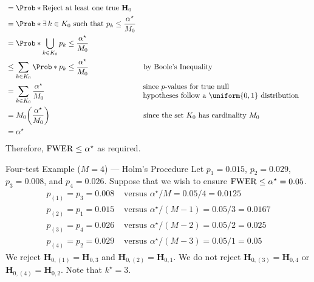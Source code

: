 \begin{Proof}{ \dagger}{}
\begin{align*}
             & =\Prob*{\text{Reject at least one true $\mathbf{H}_0$}}                                                                            \\
             & =\Prob*{\exists\, k\in K_0\text{ such that }p_k\le \frac{\alpha^\star}{M_0}}                                                       \\
             & =\Prob*{\bigcup_{k\in K_0}p_k\le \frac{\alpha^\star}{M_0}}                                                                         \\
             & \le \sum_{k\in K_0}\Prob*{p_k\le \frac{\alpha^\star}{M_0}}                   &  & \text{by Boole's Inequality}                     \\
             & =\sum_{k\in K_0}\frac{\alpha^\star}{M_0}                                     &  & \!\!\!\!\begin{tabular}{l}
                  \text{since $p$-values for true null} \\
                  \text{hypotheses follow a $\uniform{0,1}$ distribution}
            \end{tabular}               \\
             & =M_0\biggl(\frac{\alpha^\star}{M_0}\biggr)                                   &  & \text{since the set $K_0$ has cardinality $M_0$} \\
             & =\alpha^\star
      \end{align*}
      Therefore, $ \operatorname{FWER}\le \alpha^\star $ as required.
\end{Proof}
\begin{Example}{Four-test Example ($ M=4 $) --- Holm's Procedure}{}
      Let $ p_1=0.015 $, $ p_2=0.029 $, $ p_3=0.008 $, and $ p_4=0.026 $. Suppose that we wish to ensure
      $ \operatorname{FWER}\le \alpha^\star=0.05 $.
      \begin{align*}
            p_{(1)}=p_3=0.008 & \text{ versus } \alpha^\star/M=0.05/4=0.0125     \\
            p_{(2)}=p_1=0.015 & \text{ versus } \alpha^\star/(M-1)=0.05/3=0.0167 \\
            p_{(3)}=p_4=0.026 & \text{ versus } \alpha^\star/(M-2)=0.05/2=0.025  \\
            p_{(4)}=p_2=0.029 & \text{ versus } \alpha^\star/(M-3)=0.05/1=0.05
      \end{align*}
      We reject $ \mathbf{H}_{0,(1)}=\mathbf{H}_{0,3} $ and $ \mathbf{H}_{0,(2)}=\mathbf{H}_{0,1} $. We do not reject
      $ \mathbf{H}_{0,(3)}=\mathbf{H}_{0,4} $ or $ \mathbf{H}_{0,(4)}=\mathbf{H}_{0,2} $. Note that $ k^\star=3 $.
\end{Example}
